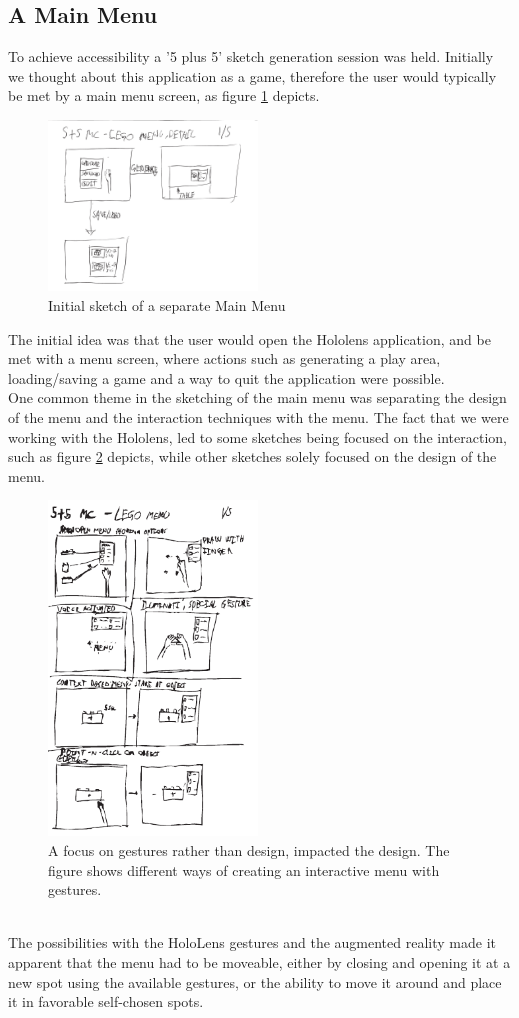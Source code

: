 \subsection{A Main Menu}
To achieve accessibility a '5 plus 5' sketch generation session was held. Initially we thought about this application as a game, therefore the user would typically be met by a main menu screen, as figure \ref{fig:menu8} depicts.
\begin{figure}[t]
	\centering
	\includegraphics[width=210px]{figures/Menu/menu8_1.pdf}
	\caption{Initial sketch of a separate Main Menu}
	\label{fig:menu8}
\end{figure}
The initial idea was that the user would open the Hololens application, and be met with a menu screen, where actions such as generating a play area, loading/saving a game and a way to quit the application were possible. \\
One common theme in the sketching of the main menu was separating the design of the menu and the interaction techniques with the menu. The fact that we were working with the Hololens, led to some sketches being focused on the interaction, such as figure \ref{fig:menugesture} depicts,  while other sketches solely focused on the design of the menu.\\
\begin{figure}[t]
	\centering
	\includegraphics[width=210px]{figures/Menu/menu5_1.pdf}
	\caption{A focus on gestures rather than design, impacted the design. The figure shows different ways of creating an interactive menu with gestures.}
	\label{fig:menugesture}
\end{figure}
\\
The possibilities with the HoloLens gestures and the augmented reality made it apparent that the menu had to be moveable, either by closing and opening it at a new spot using the available gestures, or the ability to move it around and place it in favorable self-chosen spots.
